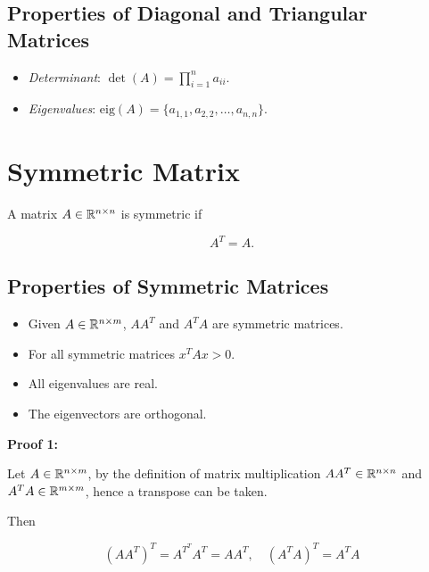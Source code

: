 \subsection{Properties of Diagonal and Triangular Matrices}

\begin{itemize}

    \item \emph{Determinant}: \(\det(A) = \prod_{i = 1}^{n} a_{ii}\).

    \item \emph{Eigenvalues}: \(\mathrm{eig}(A) = \{a_{1,1}, a_{2,2}, \dots, a_{n,n}\}\).

\end{itemize}

\section{Symmetric Matrix}

A matrix \(A \in \mathbb{R}^{n \times n}\) is symmetric if 

\[
    A^T = A.
\]

\subsection{Properties of Symmetric Matrices}

\begin{itemize}

    \item Given \(A \in \mathbb{R}^{n \times m}\), \(AA^T \) and \(A^T A\) are symmetric matrices.

    \item For all symmetric matrices \(x^T Ax > 0\).

    \item All eigenvalues are real.
   
    \item The eigenvectors are orthogonal.

\end{itemize}

\textbf{Proof 1:}

Let \(A \in \mathbb{R}^{n \times m}\), by the definition of matrix multiplication \(AA^T \in \mathbb{R}^{n \times n}\) and \(A^T A \in \mathbb{R}^{m \times m}\), hence 
a transpose can be taken.

Then

\[
    (AA^T)^T = A^{T^T} A^T = A A^T, \quad (A^TA)^T = A^T A
\]

\QED

